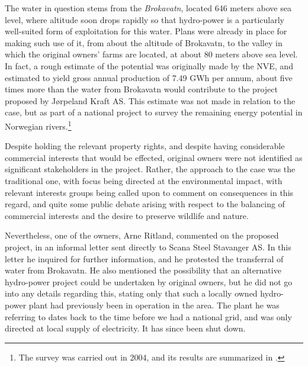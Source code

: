 The water in question stems from the \emph{Brokavatn}, located 646 meters above sea level, where altitude soon drops rapidly so that hydro-power is a particularly well-suited form of exploitation for this water. Plans were already in place for making such use of it, from about the altitude of Brokavatn, to the valley in which the original owners' farms are located, at about 80 meters above sea level. In fact, a rough estimate of the potential was originally made by the NVE, and estimated to yield gross annual production of 7.49 GWh per annum, about five times more than the water from Brokavatn would contribute to the project proposed by Jørpeland Kraft AS. This estimate was not made in relation to the case, but as part of a national project to survey the remaining energy potential in Norwegian rivers.\footnote{The survey was carried out in 2004, and its results are summarized in \cite{kartlegging}.} %

Despite holding the relevant property rights, and despite having considerable commercial interests that would be effected, original owners were not identified as significant stakeholders in the project. Rather, the approach to the case was the traditional one, with focus being directed at the environmental impact, with relevant interests groups being called upon to comment on consequences in this regard, and quite some public debate arising with respect to the balancing of commercial interests and the desire to preserve wildlife and nature.

Nevertheless, one of the owners, Arne Ritland, commented on the proposed project, in an informal letter sent directly to Scana Steel Stavanger AS. In this letter he inquired for further information, and he protested the transferral of water from Brokavatn. He also mentioned the possibility that an alternative hydro-power project could be undertaken by original owners, but he did not go into any details regarding this, stating only that such a locally owned hydro-power plant had previously been in operation in the area. The plant he was referring to dates back to the time before we had a national grid, and was only directed at local supply of electricity. It has since been shut down.

